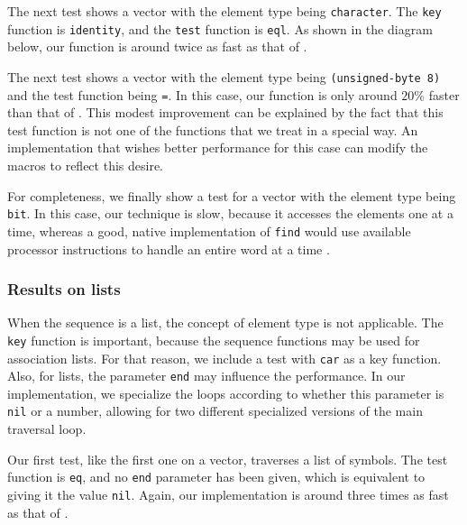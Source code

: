 
The next test shows a vector with the element type being
\texttt{character}.  The \texttt{key} function is \texttt{identity},
and the \texttt{test} function is \texttt{eql}.  As shown in the
diagram below, our function is around twice as fast as that of
\sbcl{}.


The next test shows a vector with the element type being
\texttt{(unsigned-byte 8)} and the test function being \texttt{=}.  In
this case, our function is only around $20\%$ faster than that of
\sbcl{}.  This modest improvement can be explained by the fact that
this test function is not one of the functions that we treat in a
special way.  An implementation that wishes better performance for
this case can modify the macros to reflect this desire.


For completeness, we finally show a test for a vector with the element
type being \texttt{bit}.  In this case, our technique is slow, because
it accesses the elements one at a time, whereas a good, native
implementation of \texttt{find} would use available processor
instructions to handle an entire word at a time
\cite{Baker:1990:EIB:121989.121991}.


\subsubsection{Results on lists}

When the sequence is a list, the concept of element type is not
applicable.  The \texttt{key} function is important, because the
sequence functions may be used for association lists.  For that
reason, we include a test with \texttt{car} as a key function.  Also,
for lists, the parameter \texttt{end} may influence the performance.
In our implementation, we specialize the loops according to whether
this parameter is \texttt{nil} or a number, allowing for two different
specialized versions of the main traversal loop.

Our first test, like the first one on a vector, traverses a list of
symbols.  The test function is \texttt{eq}, and no \texttt{end}
parameter has been given, which is equivalent to giving it the value
\texttt{nil}.  Again, our implementation is around three times as fast
as that of \sbcl{}.

